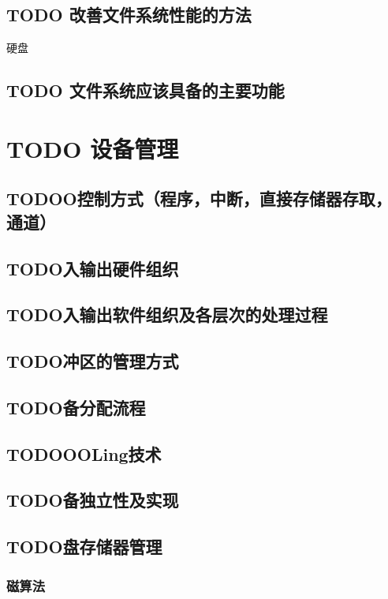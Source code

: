 \documentclass[11pt]{article}
\begin{document}
\subsection{{\bfseries\sffamily TODO} 改善文件系统性能的方法}
\label{sec-4-9}
硬盘
\subsection{{\bfseries\sffamily TODO} 文件系统应该具备的主要功能}
\label{sec-4-10}

\section{{\bfseries\sffamily TODO} 设备管理}
\label{sec-5}
\subsection{TODOO控制方式（程序，中断，直接存储器存取，通道）}
\label{sec-5-1}
\subsection{TODO入输出硬件组织}
\label{sec-5-2}
\subsection{TODO入输出软件组织及各层次的处理过程}
\label{sec-5-3}
\subsection{TODO冲区的管理方式}
\label{sec-5-4}
\subsection{TODO备分配流程}
\label{sec-5-5}
\subsection{TODOOOLing技术}
\label{sec-5-6}
\subsection{TODO备独立性及实现}
\label{sec-5-7}
\subsection{TODO盘存储器管理}
\label{sec-5-8}
\subsubsection{磁算法}
\label{sec-5-8-1}
\end{document}
